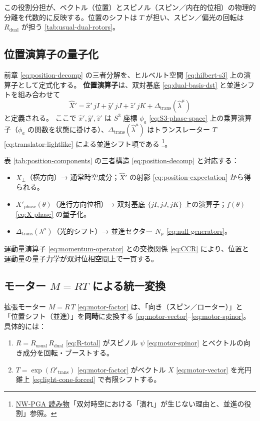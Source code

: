 \documentclass[dvipdfmx,a4paper,oneside]{jsbook}
\numberwithin{equation}{chapter}
\begin{document}
この役割分担が、ベクトル（位置）とスピノル（スピン／内在的位相）の物理的分離を代数的に反映する。位置のシフトは \(T\) が担い、スピン／偏光の回転は \(R_{\mathrm{dual}}\) が担う \eqref{tab:usual-dual-rotors}。

\subsection{位置演算子の量子化}

前章 \eqref{eq:position-decomp} の三者分解を、ヒルベルト空間 \eqref{eq:hilbert-s3} 上の演算子として定式化する。
\textbf{位置演算子}は、双対基底 \eqref{eq:dual-basis-dst} と並進シフトを組み合わせて
\begin{equation}
  \hat{X}'
  = \hat{x}'\, jI + \hat{y}'\, jJ + \hat{z}'\, jK
  + \Delta_{\mathrm{trans}}(\hat{\lambda}^\mu)
  \label{eq:position-op-quantum}
\end{equation}
と定義される。
ここで \(\hat{x}', \hat{y}', \hat{z}'\) は \(S^3\) 座標 \(\phi_a\) \eqref{eq:S3-phase-space} 上の乗算演算子（\(\phi_a\) の関数を状態に掛ける）、\(\Delta_{\mathrm{trans}}(\hat{\lambda}^\mu)\) はトランスレーター \(T\) \eqref{eq:translator-lightlike} による並進シフト項である \footnote{\hyperref[sec:sister-manuscripts]{NW-PGA 読み物}「双対時空における「潰れ」が生じない理由と、並進の役割」参照。}。

表 \ref{tab:position-components} の三者構造 \eqref{eq:position-decomp} と対応する：
\begin{itemize}[leftmargin=2em]
  \item \(X_\perp\)（横方向）→ 通常時空成分；\(\hat{X}'\) の射影 \eqref{eq:position-expectation} から得られる。
  \item \(X'_{\mathrm{phase}}(\theta)\)（進行方向位相）→ 双対基底 \(\{jI, jJ, jK\}\) 上の演算子；\(f(\theta)\) \eqref{eq:X-phase} の量子化。
  \item \(\Delta_{\mathrm{trans}}(\lambda^\mu)\)（光的シフト）→ 並進セクター \(N_\mu\) \eqref{eq:null-generators}。
\end{itemize}

運動量演算子 \eqref{eq:momentum-operator} との交換関係 \eqref{eq:CCR} により、位置と運動量の量子力学が双対位相空間上で一貫する。

\subsection{モーター \(M = RT\) による統一変換}

拡張モーター \(M = R\,T\) \eqref{eq:motor-factor} は、「向き（スピン／ローター）」と「位置シフト（並進）」を\textbf{同時}に変換する \eqref{eq:motor-vector}–\eqref{eq:motor-spinor}。
具体的には：
\begin{enumerate}[leftmargin=2em]
  \item \(R = R_{\mathrm{usual}}\, R_{\mathrm{dual}}\) \eqref{eq:R-total} がスピノル \(\psi\) \eqref{eq:motor-spinor} とベクトルの向き成分を回転・ブーストする。
  \item \(T = \exp(\Omega'_{\mathrm{trans}})\) \eqref{eq:motor-factor} がベクトル \(X\) \eqref{eq:motor-vector} を光円錐上 \eqref{eq:light-cone-forced} で有限シフトする。
\end{enumerate}
\end{document}

